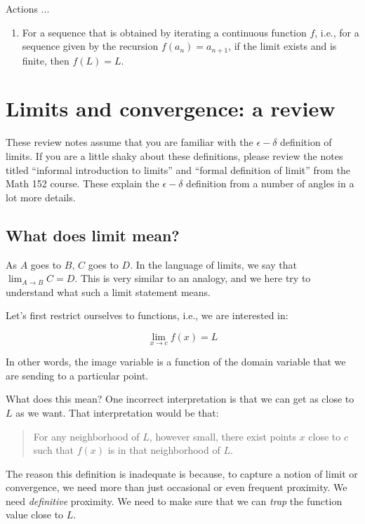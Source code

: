 \documentclass[10pt]{amsart}
\begin{document}
Actions ...

\begin{enumerate}
\item For a sequence that is obtained by iterating a continuous
  function $f$, i.e., for a sequence given by the recursion $f(a_n) =
  a_{n+1}$, if the limit exists and is finite, then $f(L) = L$.
\end{enumerate}

\section{Limits and convergence: a review}

These review notes assume that you are familiar with the
$\epsilon-\delta$ definition of limits. If you are a little shaky
about these definitions, please review the notes titled ``informal
introduction to limits'' and ``formal definition of limit'' from the
Math 152 course. These explain the $\epsilon-\delta$ definition from a
number of angles in a lot more details.

\subsection{What does limit mean?}

As $A$ goes to $B$, $C$ goes to $D$. In the language of limits, we say
that $\lim_{A \to B} C = D$. This is very similar to an analogy, and
we here try to understand what such a limit statement means.

Let's first restrict ourselves to functions, i.e., we are interested in:

$$\lim_{x \to c} f(x) = L$$

In other words, the image variable is a function of the domain
variable that we are sending to a particular point.

What does this mean? One incorrect interpretation is that we can get
as close to $L$ as we want. That interpretation would be that:

\begin{quote}
  For any neighborhood of $L$, however small, there exist points $x$
  close to $c$ such that $f(x)$ is in that neighborhood of $L$.
\end{quote}

The reason this definition is inadequate is because, to capture a
notion of limit or convergence, we need more than just occasional or
even frequent proximity. We need {\em definitive} proximity. We need
to make sure that we can {\em trap} the function value close to $L$.
\end{document}
